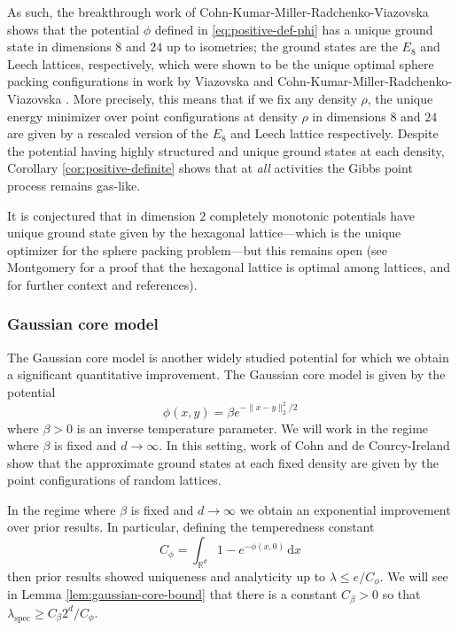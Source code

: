 \documentclass[10pt]{amsart}
\theoremstyle{definition}
\theoremstyle{remark}
\newcommand{\spec}{{\mathrm{spec}}}
\newcommand{\R}{\mathbb{R}}
\newcommand{\diff}{\mathrm{d}}
\begin{document}
	As such, the breakthrough work of Cohn-Kumar-Miller-Radchenko-Viazovska \cite{cohn2022universal} shows that the potential $\phi$ defined in \eqref{eq:positive-def-phi} has a unique ground state in dimensions $8$ and $24$ up to isometries; the ground states are the $E_8$ and Leech lattices, respectively, which were shown to be the unique optimal sphere packing configurations in work by Viazovska \cite{viazovska2017sphere} and Cohn-Kumar-Miller-Radchenko-Viazovska \cite{cohn2017sphere}.  More precisely, this means that if we fix any density $\rho$, the unique energy minimizer over point configurations at density $\rho$ in dimensions $8$ and $24$ are given by a rescaled version of the $E_8$ and Leech lattice respectively.  Despite the potential having highly structured and unique ground states at each density, Corollary \ref{cor:positive-definite} shows that at \emph{all} activities the Gibbs point process remains gas-like. 
	
	It is conjectured that in dimension $2$ completely monotonic potentials have unique ground state given by the hexagonal lattice---which is the unique optimizer for the sphere packing problem---but this remains open (see Montgomery \cite{montgomery1988minimal} for a proof that the hexagonal lattice is optimal among lattices, and \cite{cohn2022universal} for further context and references).
	
	
	
	
	
	
	
	
	\subsubsection{Gaussian core model}  
	The Gaussian core model is another widely studied potential for which we obtain a significant quantitative improvement. 
	The Gaussian core model is given by the potential $$\phi(x,y) = \beta e^{-\|x - y\|_2^2 / 2}$$ where $\beta > 0$ is an inverse temperature parameter. We will work in the regime where $\beta$ is fixed and $d \to \infty$.  In this setting, work of Cohn and de Courcy-Ireland \cite{cohn2018gaussian} show that the approximate ground states at each fixed density are given by the point configurations of random lattices.
	
	In the regime where $\beta$ is fixed and $d \to \infty$ we obtain an exponential improvement over prior results.  In particular, defining the temperedness constant $$C_\phi = \int_{\R^d} 1 - e^{-\phi(x,0)} \,\diff x$$
	then prior results \cite{michelen2023analyticity,michelen2025potential} showed uniqueness and analyticity up to $\lambda \leq e/C_\phi$.  We will see in Lemma \ref{lem:gaussian-core-bound} that there is a constant $C_\beta > 0$ so that $\lambda_{\spec} \geq C_\beta 2^d / C_\phi$.
	
\end{document}
